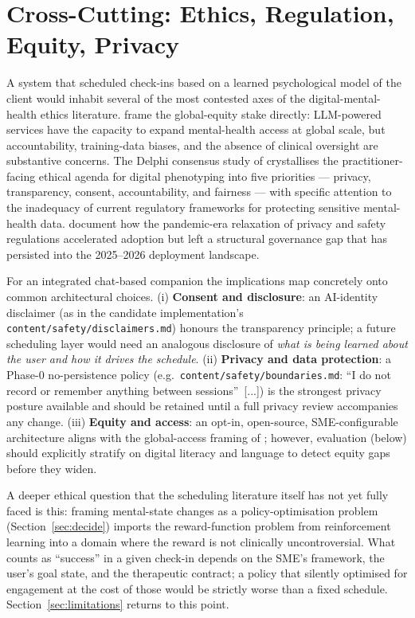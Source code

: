 \documentclass[10pt,conference]{article}
\newcommand{\secref}[1]{Section~\ref{#1}}
\begin{document}
\section{Cross-Cutting: Ethics, Regulation, Equity, Privacy}\label{sec:ethics}

A system that scheduled check-ins based on a learned psychological
model of the client would inhabit several of the most contested axes
of the digital-mental-health ethics literature.
\cite{vanHeerden2023LLMGlobalMH} frame the global-equity stake
directly: LLM-powered services have the capacity to expand
mental-health access at global scale, but accountability, training-data
biases, and the absence of clinical oversight are substantive
concerns. The Delphi consensus study of
\cite{MartinezMartin2021DigitalPhenotypingEthics} crystallises the
practitioner-facing ethical agenda for digital phenotyping into five
priorities --- privacy, transparency, consent, accountability, and
fairness --- with specific attention to the inadequacy of current
regulatory frameworks for protecting sensitive mental-health data.
\cite{MartinezMartin2020COVIDDigitalMHEthics} document how the
pandemic-era relaxation of privacy and safety regulations accelerated
adoption but left a structural governance gap that has persisted into
the 2025--2026 deployment landscape.

For an integrated chat-based companion the implications map concretely
onto common architectural choices.
(i) \textbf{Consent and disclosure}: an AI-identity disclaimer (as in
the candidate implementation's
\texttt{content/safety/disclaimers.md}) honours the transparency
principle; a future scheduling layer would need an analogous
disclosure of \emph{what is being learned about the user and how it
drives the schedule}. (ii) \textbf{Privacy and data protection}: a
Phase-0 no-persistence policy (e.g.\
\texttt{content/safety/boundaries.md}: ``I do not record or remember
anything between sessions''~[...]) is the strongest privacy posture
available and should be retained until a full privacy review
accompanies any change. (iii) \textbf{Equity and access}: an
opt-in, open-source, SME-configurable architecture aligns with the
global-access framing of \cite{vanHeerden2023LLMGlobalMH}; however,
evaluation (below) should explicitly stratify on digital literacy and
language to detect equity gaps before they widen.

A deeper ethical question that the scheduling literature itself has
not yet fully faced is this: framing mental-state changes as a
policy-optimisation problem (\secref{sec:decide}) imports the
reward-function problem from reinforcement learning into a domain
where the reward is not clinically uncontroversial. What counts as
``success'' in a given check-in depends on the SME's framework,
the user's goal state, and the therapeutic contract; a policy that
silently optimised for engagement at the cost of those would be
strictly worse than a fixed schedule. \secref{sec:limitations} returns
to this point.
\end{document}
